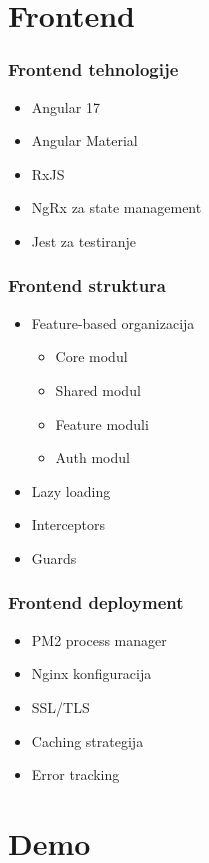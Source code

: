 \documentclass[aspectratio=169]{beamer}
\begin{document}
\section{Frontend}

\begin{frame}
    \frametitle{Frontend tehnologije}
    \begin{itemize}
        \item Angular 17
        \item Angular Material
        \item RxJS
        \item NgRx za state management
        \item Jest za testiranje
    \end{itemize}
\end{frame}

\begin{frame}
    \frametitle{Frontend struktura}
    \begin{itemize}
        \item Feature-based organizacija
        \begin{itemize}
            \item Core modul
            \item Shared modul
            \item Feature moduli
            \item Auth modul
        \end{itemize}
        \item Lazy loading
        \item Interceptors
        \item Guards
    \end{itemize}
\end{frame}

\begin{frame}
    \frametitle{Frontend deployment}
    \begin{itemize}
        \item PM2 process manager
        \item Nginx konfiguracija
        \item SSL/TLS
        \item Caching strategija
        \item Error tracking
    \end{itemize}
\end{frame}

\section{Demo}
\end{document}
